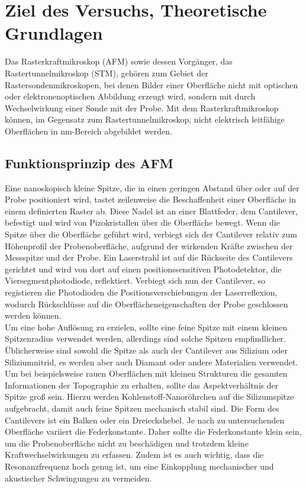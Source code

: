 \chapter{Ziel des Versuchs, Theoretische Grundlagen}

Das Rasterkraftmikroskop (AFM) sowie dessen Vorgänger, das Rastertunnelmikroskop (STM), gehören zum Gebiet der Rastersondenmikroskopen, bei denen Bilder einer Oberfläche nicht mit optischen oder elektronenoptischen Abbildung erzeugt wird, sondern mit durch Wechselwirkung einer Sonde mit der Probe. Mit dem Rasterkraftmikroskop können, im Gegensatz zum Rastertunnelmikroskop, nicht elektrisch leitfähige Oberflächen in nm-Bereich abgebildet werden.

\section{Funktionsprinzip des AFM}
Eine nanoskopisch kleine Spitze, die in einen geringen Abstand über oder auf der Probe positioniert wird, tastet zeilenweise die Beschaffenheit einer Oberfläche in einem definierten Raster ab. Diese Nadel ist an einer Blattfeder, dem Cantilever, befestigt und wird von Pizokristallen über die Oberfläche bewegt. Wenn die Spitze über die Oberfläche geführt wird, verbiegt sich der Cantilever relativ zum Höhenprofil der Probenoberfläche, aufgrund der wirkenden Kräfte zwischen der Messspitze und der Probe. Ein Laserstrahl ist auf die Rückseite des Cantilevers gerichtet und wird von dort auf einen positionssensitiven Photodetektor, die Viersegmentphotodiode, reflektiert. Verbiegt sich nun der Cantilever, so registieren die Photodioden die Positionsverschiebungen der Laserreflexion, wodurch Rückschlüsse auf die Oberflächeneigenschaften der Probe geschlossen werden können.\\
Um eine hohe Auflösung zu erzielen, sollte eine feine Spitze mit einem kleinen Spitzenradius verwendet werden, allerdings sind solche Spitzen empfindlicher. Üblicherweise sind sowohl die Spitze als auch der Cantilever aus Silizium oder Siliziumnitrid, es werden aber auch Diamant oder andere Materialien verwendet. Um bei beispielsweise rauen Oberflächen mit kleinen Strukturen die gesamten Informationen der Topographie zu erhalten, sollte das Aspektverhältnis der Spitze groß sein. Hierzu werden Kohlenstoff-Nanoröhrchen auf die Silizumspitze aufgebracht, damit auch feine Spitzen mechanisch stabil sind. Die Form des Cantilevers ist ein Balken oder ein Dreieckshebel. Je nach zu untersuchenden Oberfläche variiert die Federkonstante. Daher sollte die Federkonstante klein sein, um die Probenoberfläche nicht zu beschädigen und trotzdem kleine Kraftwechselwirkungen zu erfassen. Zudem ist es auch wichtig, dass die Resonanzfrequenz hoch genug ist, um eine Einkopplung mechanischer und akustischer Schwingungen zu vermeiden.
